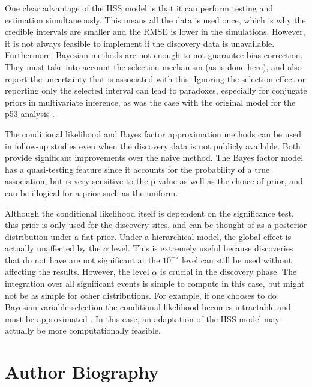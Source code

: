 \documentclass[AMA,STIX1COL]{WileyNJD-v2}\usepackage[]{graphicx}\usepackage[]{color}
\begin{document}
One clear advantage of the HSS model is that it can perform testing and estimation simultaneously. This means all the data is used once, which is why the credible intervals are smaller and the RMSE is lower in the simulations. However, it is not always feasible to implement if the discovery data is unavailable. Furthermore, Bayesian methods are not enough to not guarantee bias correction. They must take into account the selection mechanism (as is done here), and also report the uncertainty that is associated with this. Ignoring the selection effect or reporting only the selected interval can lead to paradoxes, especially for conjugate priors in multivariate inference, as was the case with the original model for the p53 analysis \cite{dawid1994selection}.

The conditional likelihood and Bayes factor approximation methods can be used in follow-up studies even when the discovery data is not publicly available. Both provide significant improvements over the naive method. The Bayes factor model has a quasi-testing feature since it accounts for the probability of a true association, but is very sensitive to the p-value as well as the choice of prior, and can be illogical for a prior such as the uniform.

Although the conditional likelihood itself is dependent on the significance test, this prior is only used for the discovery sites, and can be thought of as a posterior distribution under a flat prior. Under a hierarchical model, the global effect is actually unaffected by the $\alpha$ level. This is extremely useful because discoveries that do not have are not significant at the $10^{-7}$ level can still be used without affecting the results. However, the level $\alpha$ is crucial in the discovery phase. The integration over all significant events is simple to compute in this case, but might not be as simple for other distributions. For example, if one chooses to do Bayesian variable selection the conditional likelihood becomes intractable and must be approximated \cite{panigrahi2016bayesian}. In this case, an adaptation of the HSS model may actually be more computationally feasible.



\nocite{*}%


\clearpage

\section*{Author Biography}
\end{document}
